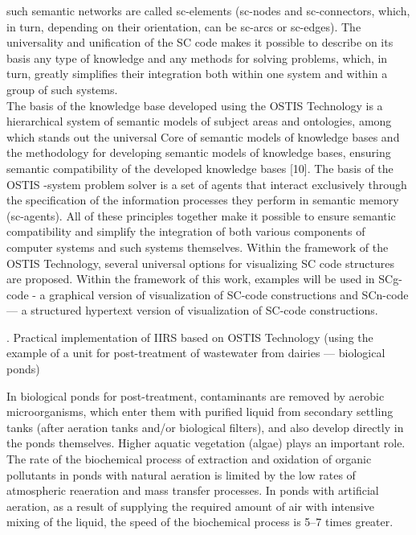 \documentclass[10pt,final]{article}
\newcommand{\RomanNumeralCaps}[1]
    {\MakeUppercase{\romannumeral #1}}
\begin{document}
\begin{multicols}{2}
\noindent such semantic networks are called sc-elements (sc-nodes
and sc-connectors, which, in turn, depending on their
orientation, can be sc-arcs or sc-edges). The universality
and unification of the SC code makes it possible to
describe on its basis any type of knowledge and any
methods for solving problems, which, in turn, greatly
simplifies their integration both within one system and
within a group of such systems.\\
\vspace{-0.1em}
\hspace{0.4cm}The basis of the knowledge base developed using the
OSTIS Technology is a hierarchical system of semantic
models of subject areas and ontologies, among which
stands out the universal Core of semantic models of
knowledge bases and the methodology for developing
semantic models of knowledge bases, ensuring semantic
compatibility of the developed knowledge bases [10]. The
basis of the OSTIS -system problem solver is a set of
agents that interact exclusively through the specification
of the information processes they perform in semantic
memory (sc-agents). All of these principles together
make it possible to ensure semantic compatibility and
simplify the integration of both various components of
computer systems and such systems themselves. Within
the framework of the OSTIS Technology, several universal options for visualizing SC code structures are
proposed. Within the framework of this work, examples
will be used in SCg-code - a graphical version of
visualization of SC-code constructions and SCn-code —
a structured hypertext version of visualization of SC-code
constructions.
\vspace{-\topsep}
\begin{center}
\RomanNumeralCaps{4}. Practical implementation of IIRS based on OSTIS
Technology (using the example of a unit for
post-treatment of wastewater from dairies — biological
ponds)
\end{center}
\vspace{-\topsep}
In biological ponds for post-treatment, contaminants
are removed by aerobic microorganisms, which enter
them with purified liquid from secondary settling tanks
(after aeration tanks and/or biological filters), and also
develop directly in the ponds themselves. Higher aquatic
vegetation (algae) plays an important role. The rate
of the biochemical process of extraction and oxidation
of organic pollutants in ponds with natural aeration is
limited by the low rates of atmospheric reaeration and
mass transfer processes. In ponds with artificial aeration,
as a result of supplying the required amount of air
with intensive mixing of the liquid, the speed of the
biochemical process is 5–7 times greater.


\end{multicols}
\end{document}
